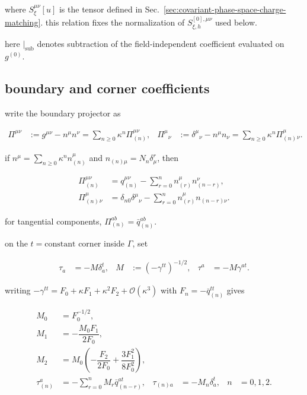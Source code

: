 where $\displaystyle{S_{\xi}^{\mu \nu}[u]}$ is the tensor defined in Sec.~\ref{sec:covariant-phase-space-charge-matching}. this relation fixes the normalization of $\displaystyle{S_{\xi,h}^{[0],\mu \nu}}$ used below.

here $\displaystyle{|_{\mathrm{sub}}}$ denotes subtraction of the field-independent coefficient evaluated on $\displaystyle{g^{(0)}}$.

\subsection{boundary and corner coefficients}\label{subsec:boundary-corner-coefficients}

write the boundary projector as

\begin{align}
\Pi ^{\mu \nu} & :=g^{\mu \nu}-n^{\mu}n^{\nu}=\sum _{n\geq 0}\kappa ^n\Pi _{(n)}^{\mu \nu}, & \Pi ^{\mu}{}_{\nu}&:=\delta ^{\mu}{}_{\nu}-n^{\mu}n_{\nu}=\sum _{n\geq 0}\kappa ^n\Pi _{(n)}^{\mu}{}_{\nu}.
\end{align}

if $\displaystyle{n^{\mu}=\sum _{n\geq0}\kappa ^nn_{(n)}^{\mu}}$ and $\displaystyle{n_{(n)\mu}=N_{n}\delta ^r_{\mu}}$, then

\[\begin{aligned}
\Pi _{(n)}^{\mu \nu} & =q_{(n)}^{\mu \nu}-\sum _{r=0}^{n}n_{(r)}^{\mu}n_{(n-r)}^{\nu}, \\
\Pi _{(n)}^{\mu}{}_{\nu} & =\delta _{n0}\delta ^{\mu}{}_{\nu}-\sum _{r=0}^{n}n_{(r)}^{\mu}n_{(n-r)\nu}.
\end{aligned}\]

for tangential components, $\displaystyle{\Pi _{(n)}^{ab}=\bar q_{(n)}^{ab}}$.

on the $\displaystyle{t=\text{constant}}$ corner inside $\displaystyle{\Gamma}$, set

\begin{align}
\tau _{a} & =-M\delta _{a}^{t}, & M&:=(-\gamma ^{tt})^{-1/2}, & \tau ^a&=-M\gamma ^{at}.
\end{align}

writing $\displaystyle{-\gamma ^{tt}=F_{0}+\kappa F_{1}+\kappa ^2F_{2}+\mathcal{O}(\kappa ^3)}$ with $\displaystyle{F_{n}=-\bar q_{(n)}^{tt}}$ gives

\[\begin{aligned}
M_{0} & =F_{0}^{-1/2}, \\
M_{1} & =-\dfrac{M_{0}F_{1}}{2F_{0}}, \\
M_{2} & =M_{0}\left(-\dfrac{F_{2}}{2F_{0}}+\dfrac{3F_{1}^{2}}{8F_{0}^{2}}\right), \\
\tau _{(n)}^{a} & =-\sum _{r=0}^{n}M_{r}\bar q_{(n-r)}^{at}, & \tau _{(n)a}&=-M_{n}\delta _a^t, & n&=0,1,2.
\end{aligned}\]

